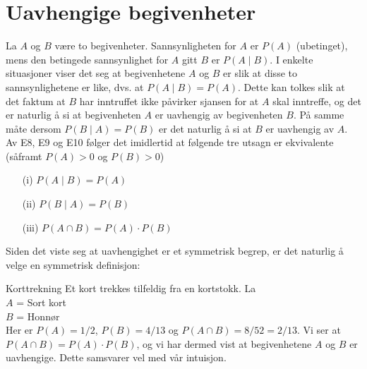 \section{Uavhengige begivenheter}

La $A$ og $B$ være to begivenheter. Sannsynligheten for $A$ er
$P(A)$ (ubetinget), mens den betingede sannsynlighet for $A$ gitt
$B$ er $P(A\mid B)$. I enkelte si\-tua\-sjoner viser det seg at
begivenhetene $A$ og $B$ er slik at disse to sannsynlighetene er
like, dvs. at $P(A\mid B)=P(A)$. Dette kan tolkes slik at det
faktum at $B$ har inntruffet ikke påvirker sjansen for at $A$
skal inntreffe, og det er naturlig å si at begivenheten $A$ er
uavhengig av begivenheten $B$. På samme måte dersom $P(B\mid A) =
P(B)$ er det naturlig å si at $B$ er uavhengig av $A$.
Av E8, E9 og E10 følger det imidlertid at følgende tre utsagn er
ekvivalente (såframt $P(A)>0$ og $P(B)>0$)
\begin{itemize}
\item[(i)]                 $P(A\mid B)  = P(A)$
\item[(ii)]                $P(B\mid A)  = P(B)$
\item[(iii)]               $P(A\cap B)  = P(A) \cdot P(B)$
\end{itemize}
Siden det viste seg at uavhengighet er et symmetrisk begrep, er
det naturlig å velge en symmetrisk definisjon:
\begin{center}  \end{center}

\begin{eksempel}{Korttrekning}
Et kort trekkes tilfeldig fra en kortstokk. La \\[3mm]
\indent     $A$ = Sort kort \\
\indent     $B$ = Honnør \\[3mm]
Her er $P(A)=1/2$, $P(B)=4/13$ og $P(A \cap B)=8/52=2/13$.
Vi ser at $P(A\cap B)=P(A)\cdot P(B)$, og vi har dermed vist at
begivenhetene $A$ og $B$ er uavhengige. Dette samsvarer vel med
vår intuisjon.
\end{eksempel}

